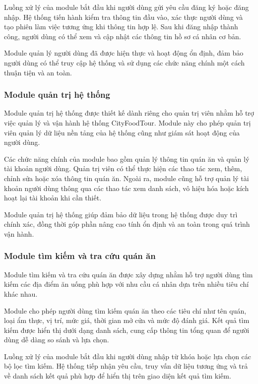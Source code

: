 Luồng xử lý của module bắt đầu khi người dùng gửi yêu cầu đăng ký hoặc đăng nhập. Hệ thống tiến hành kiểm tra thông tin đầu vào, xác thực người dùng và tạo phiên làm việc tương ứng khi thông tin hợp lệ. Sau khi đăng nhập thành công, người dùng có thể xem và cập nhật các thông tin hồ sơ cá nhân cơ bản.

Module quản lý người dùng đã được hiện thực và hoạt động ổn định, đảm bảo người
dùng có thể truy cập hệ thống và sử dụng các chức năng chính một cách thuận tiện và an toàn.



\subsubsection{Module quản trị hệ thống}
Module quản trị hệ thống được thiết kế dành riêng cho quản trị viên nhằm hỗ trợ việc quản lý và vận hành hệ thống CityFoodTour. Module này cho phép quản trị viên quản lý dữ liệu nền tảng của hệ thống cũng như giám sát hoạt động của người dùng.

Các chức năng chính của module bao gồm quản lý thông tin quán ăn và quản lý tài
khoản người dùng. Quản trị viên có thể thực hiện các thao tác xem, thêm, chỉnh sửa hoặc xóa thông tin quán ăn. Ngoài ra, module cũng hỗ trợ quản lý tài khoản người dùng thông qua các thao tác xem danh sách, vô hiệu hóa hoặc kích hoạt lại tài khoản khi cần thiết.

Module quản trị hệ thống giúp đảm bảo dữ liệu trong hệ thống được duy trì chính xác, đồng thời góp phần nâng cao tính ổn định và an toàn trong quá trình vận hành.
\subsubsection{Module tìm kiếm và tra cứu quán ăn}
Module tìm kiếm và tra cứu quán ăn được xây dựng nhằm hỗ trợ người dùng tìm kiếm
các địa điểm ăn uống phù hợp với nhu cầu cá nhân dựa trên nhiều tiêu chí khác nhau.

Module cho phép người dùng tìm kiếm quán ăn theo các tiêu chí như tên quán, loại
ẩm thực, vị trí, mức giá, thời gian mở cửa và mức độ đánh giá. Kết quả tìm kiếm được hiển thị dưới dạng danh sách, cung cấp thông tin tổng quan để người dùng dễ dàng so sánh và lựa chọn.

Luồng xử lý của module bắt đầu khi người dùng nhập từ khóa hoặc lựa chọn các bộ lọc tìm kiếm. Hệ thống tiếp nhận yêu cầu, truy vấn dữ liệu tương ứng và trả về danh sách kết quả phù hợp để hiển thị trên giao diện kết quả tìm kiếm.

